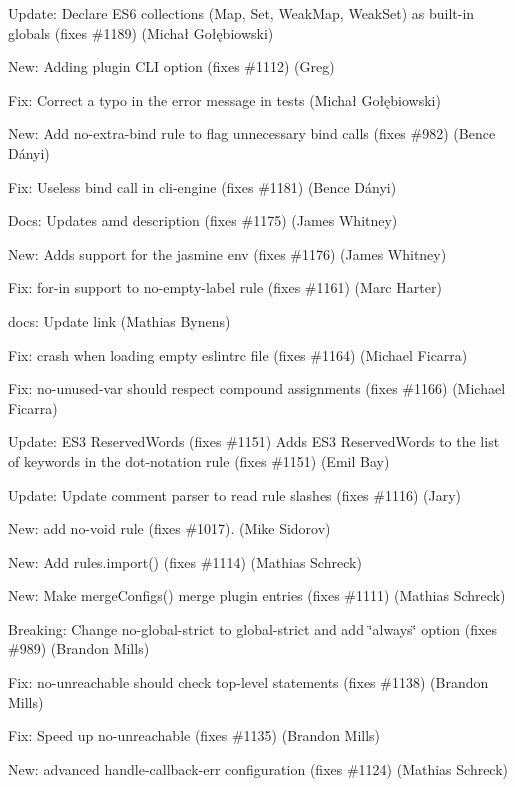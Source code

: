 \begin{DoxyItemize}
\item Update\+: Declare E\+S6 collections (Map, Set, Weak\+Map, Weak\+Set) as built-\/in globals (fixes \#1189) (Michał Gołębiowski)
\item New\+: Adding \textquotesingle{}plugin\textquotesingle{} C\+LI option (fixes \#1112) (Greg)
\item Fix\+: Correct a typo in the error message in tests (Michał Gołębiowski)
\item New\+: Add no-\/extra-\/bind rule to flag unnecessary bind calls (fixes \#982) (Bence Dányi)
\item Fix\+: Useless bind call in cli-\/engine (fixes \#1181) (Bence Dányi)
\item Docs\+: Updates {\ttfamily amd} description (fixes \#1175) (James Whitney)
\item New\+: Adds support for the {\ttfamily jasmine} env (fixes \#1176) (James Whitney)
\item Fix\+: for-\/in support to no-\/empty-\/label rule (fixes \#1161) (Marc Harter)
\item docs\+: Update link (Mathias Bynens)
\item Fix\+: crash when loading empty eslintrc file (fixes \#1164) (Michael Ficarra)
\item Fix\+: no-\/unused-\/var should respect compound assignments (fixes \#1166) (Michael Ficarra)
\item Update\+: E\+S3 {\ttfamily Reserved\+Word}s (fixes \#1151) Adds E\+S3 {\ttfamily Reserved\+Word}s to the list of keywords in the {\ttfamily dot-\/notation} rule (fixes \#1151) (Emil Bay)
\item Update\+: Update comment parser to read rule slashes (fixes \#1116) (Jary)
\item New\+: add no-\/void rule (fixes \#1017). (Mike Sidorov)
\item New\+: Add rules.\+import() (fixes \#1114) (Mathias Schreck)
\item New\+: Make merge\+Configs() merge plugin entries (fixes \#1111) (Mathias Schreck)
\item Breaking\+: Change no-\/global-\/strict to global-\/strict and add \char`\"{}always\char`\"{} option (fixes \#989) (Brandon Mills)
\item Fix\+: no-\/unreachable should check top-\/level statements (fixes \#1138) (Brandon Mills)
\item Fix\+: Speed up no-\/unreachable (fixes \#1135) (Brandon Mills)
\item New\+: advanced handle-\/callback-\/err configuration (fixes \#1124) (Mathias Schreck)

\end{DoxyItemize}
